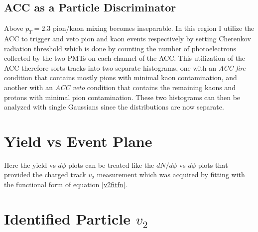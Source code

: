\subsection{ACC as a Particle Discriminator}
Above $p_T=2.3$ pion/kaon mixing becomes inseparable. In this region I utilize the ACC to trigger and veto pion and kaon events respectively by setting Cherenkov radiation threshold which is done by counting the number of photoelectrons collected by the two PMTs on each channel of the ACC. This utilization of the ACC therefore sorts tracks into two separate histograms, one with an \textit{ACC fire} condition that contains mostly pions with minimal kaon contamination, and another with an \textit{ACC veto} condition that contains the remaining kaons and protons with minimal pion contamination. These two histograms can then be analyzed with single Gaussians since the distributions are now separate.

\section{Yield vs Event Plane}
Here the yield vs $d\phi$ plots can be treated like the $dN/d\phi$ vs $d\phi$ plots that provided the charged track $v_2$ measurement which was acquired by fitting with the functional form of equation \ref{v2fitfn}. 
\section{Identified Particle $v_{2}$}

\pagebreak
\pagebreak

